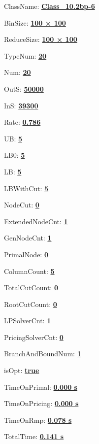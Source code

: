 \documentclass[11pt]{article}
\begin{document}
\pagestyle{empty}


ClassName: \underline{\textbf{Class_10.2bp-6}}
\par
BinSize: \underline{\textbf{100 × 100}}
\par
ReduceSize: \underline{\textbf{100 × 100}}
\par
TypeNum: \underline{\textbf{20}}
\par
Num: \underline{\textbf{20}}
\par
OutS: \underline{\textbf{50000}}
\par
InS: \underline{\textbf{39300}}
\par
Rate: \underline{\textbf{0.786}}
\par
UB: \underline{\textbf{5}}
\par
LB0: \underline{\textbf{5}}
\par
LB: \underline{\textbf{5}}
\par
LBWithCut: \underline{\textbf{5}}
\par
NodeCut: \underline{\textbf{0}}
\par
ExtendedNodeCnt: \underline{\textbf{1}}
\par
GenNodeCnt: \underline{\textbf{1}}
\par
PrimalNode: \underline{\textbf{0}}
\par
ColumnCount: \underline{\textbf{5}}
\par
TotalCutCount: \underline{\textbf{0}}
\par
RootCutCount: \underline{\textbf{0}}
\par
LPSolverCnt: \underline{\textbf{1}}
\par
PricingSolverCnt: \underline{\textbf{0}}
\par
BranchAndBoundNum: \underline{\textbf{1}}
\par
isOpt: \underline{\textbf{true}}
\par
TimeOnPrimal: \underline{\textbf{0.000 s}}
\par
TimeOnPricing: \underline{\textbf{0.000 s}}
\par
TimeOnRmp: \underline{\textbf{0.078 s}}
\par
TotalTime: \underline{\textbf{0.141 s}}
\par
\newpage


\end{document}
